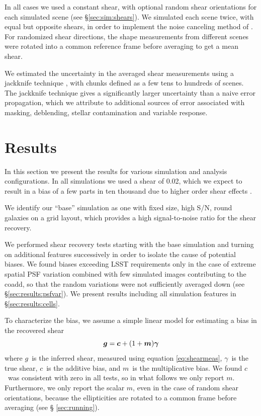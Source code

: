 \documentclass[twocolumn,twocolappendix,astrosym]{openjournal}
\newcommand{\vecg}{\mbox{\boldmath $g$}}
\newcommand{\vecc}{\mbox{\boldmath $c$}}
\newcommand{\vecm}{\mbox{\boldmath $m$}}
\newcommand{\vecgam}{\mbox{\boldmath $\gamma$}}
\newcommand{\mshear}{0.02}
\begin{document}
In all cases we used a constant shear, with optional random shear orientations
for each simulated scene (see \S \ref{sec:sim:shears}).  We simulated each
scene twice, with equal but opposite shears, in order to implement the noise
canceling method of \cite{pujol2019}.  For randomized shear directions, the
shape measurements from different scenes were rotated into a common reference
frame before averaging to get a mean shear.

We estimated the uncertainty in the averaged shear measurements using a
jackknife technique \citep{LuptonStats1993}, with chunks defined as a few tens
to hundreds of scenes.  The jackknife technique gives a significantly larger
uncertainty than a naive error propagation, which we attribute to additional
sources of error associated with masking, deblending, stellar contamination and
variable response.

\section{Results} \label{sec:results}

In this section we present the results for various simulation and analysis
configurations.  In all simulations we used a shear of \mshear, which we expect
to result in a bias of a few parts in ten thousand due to higher order
shear effects \citep{SheldonMcal2017,mdet20}.

We identify our ``base'' simulation as one with fixed size, high S/N, round
galaxies on a grid layout, which provides a high signal-to-noise ratio for the
shear recovery.

We performed shear recovery tests starting with the base simulation and turning
on additional features successively in order to isolate the cause of potential
biases.  We found biases exceeding LSST requirements only in the case of
extreme spatial PSF variation combined with few simulated images contributing
to the coadd, so that the random variations were not sufficiently averaged down
(see \S \ref{sec:results:psfvar}).  We present results including all simulation
features in \S \ref{sec:results:cells}.

To characterize the bias, we assume a simple linear model \citep[see,
e.g.,][]{heymans2006} for estimating a bias in the recovered shear
\begin{equation} \label{eq:m}
\vecg = \vecc + (1 + \vecm) \vecgam
\end{equation}
where \vecg\ is the inferred shear, measured using equation \ref{eq:shearmeas},
\vecgam\ is the true shear, \vecc\ is the additive bias, and \vecm\ is the
multiplicative bias. We found \vecc\ was consistent with zero in all tests, so
in what follows we only report \vecm.  Furthermore, we only report
the scalar $m$, even in the case of random shear orientations, because
the ellipticities are rotated to a common frame before averaging (see \S
\ref{sec:running}).
\end{document}
